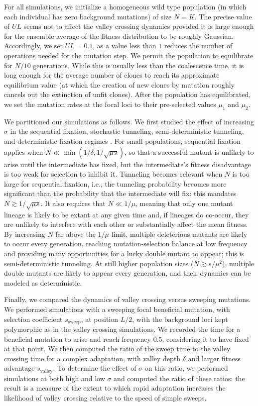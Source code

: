 \documentclass[rmp]{revtex4}
\begin{document}
\begin{spacing}{1.5}
For all simulations, we initialize a homogeneous wild type population (in which each individual has zero background mutations) of size $N = K$.
The precise value of $UL$ seems not to affect the valley crossing dynamics provided it is large enough for the ensemble average of the fitness distribution to be roughly Gaussian.
Accordingly, we set $UL = 0.1$, as a value less than $1$ reduces the number of operations needed for the mutation step.
We permit the population to equilibrate for $N/10$ generations.
While this is usually less than the coalescence time, it is long enough for the average number of clones to reach its approximate equilibrium value (at which the creation of new clones by mutation roughly cancels out the extinction of unfit clones).
After the population has equilibrated, we set the mutation rates at the focal loci to their pre-selected values $\mu_1$ and $\mu_2$.

We partitioned our simulations as follows.
We first studied the effect of increasing $\sigma$ in the sequential fixation, stochastic tunneling, semi-deterministic tunneling, and deterministic fixation regimes \citep{weissman_2009}.
For small populations, sequential fixation applies when $N \ll \min(1/\delta, 1/\sqrt{\mu s})$, so that a successful mutant is unlikely to arise until the intermediate has fixed, but the intermediate's fitness disadvantage is too weak for selection to inhibit it.
Tunneling becomes relevant when $N$ is too large for sequential fixation, i.e., the tunneling probability becomes more significant than the probability that the intermediate will fix: this mandates $N \gtrsim 1/\sqrt{\mu s}$.
It also requires that $N \ll 1/\mu$, meaning that only one mutant lineage is likely to be extant at any given time and, if lineages do co-occur, they are unlikely to interfere with each other or substantially affect the mean fitness.
By increasing $N$ far above the $1/\mu$ limit, multiple deleterious mutants are likely to occur every generation, reaching mutation-selection balance at low frequency and providing many opportunities for a lucky double mutant to appear; this is semi-deterministic tunneling.
At still higher population sizes ($N \gtrsim s/\mu^2$), multiple double mutants are likely to appear every generation, and their dynamics can be modeled as deterministic.

Finally, we compared the dynamics of valley crossing versus sweeping mutations.
We performed simulations with a sweeping focal beneficial mutation, with selection coefficient $s_{\mathrm{sweep}}$, at position $L/2$, with the background loci kept polymorphic as in the valley crossing simulations.
We recorded the time for a beneficial mutation to arise and reach frequency $0.5$, considering it to have fixed at that point.
We then computed the ratio of the sweep time to the valley crossing time for a complex adaptation, with valley depth $\delta$ and larger fitness advantage $s_{\mathrm{valley}}$.
To determine the effect of $\sigma$ on this ratio, we performed simulations at both high and low $\sigma$ and computed the ratio of these ratios: the result is a measure of the extent to which rapid adaptation increases the likelihood of valley crossing relative to the speed of simple sweeps.


\end{spacing}
\end{document}
